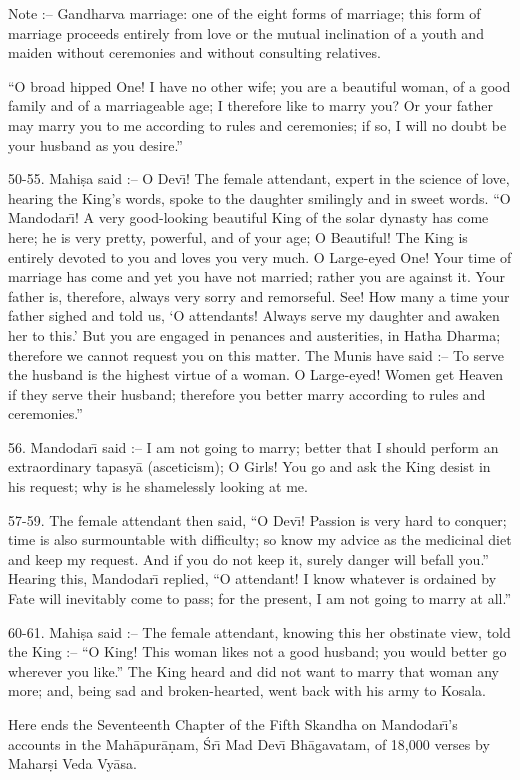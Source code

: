 Note :-- Gandharva marriage: one of the eight forms of marriage; this form of marriage proceeds entirely from love or the mutual inclination of a youth and maiden without ceremonies and without consulting relatives.

``O broad hipped One! I have no other wife; you are a beautiful woman, of a good family and of a marriageable age; I therefore like to marry you? Or your father may marry you to me according to rules and ceremonies; if so, I will no doubt be your husband as you desire.''

50-55. Mahi\d{s}a said :-- O Dev\={\i}! The female attendant, expert in the science of love, hearing the King's words, spoke to the daughter smilingly and in sweet words. ``O Mandodar\={\i}! A very good-looking beautiful King of the solar dynasty has come here; he is very pretty, powerful, and of your age; O Beautiful! The King is entirely devoted to you and loves you very much. O Large-eyed One! Your time of marriage has come and yet you have not married; rather you are against it. Your father is, therefore, always very sorry and remorseful. See! How many a time your father sighed and told us, `O attendants! Always serve my daughter and awaken her to this.' But you are engaged in penances and austerities, in Hatha Dharma; therefore we cannot request you on this matter. The Munis have said :-- To serve the husband is the highest virtue of a woman. O Large-eyed! Women get Heaven if they serve their husband; therefore you better marry according to rules and ceremonies.''

56. Mandodar\={\i} said :-- I am not going to marry; better that I should perform an extraordinary tapasy\=a (asceticism); O Girls! You go and ask the King desist in his request; why is he shamelessly looking at me.

57-59. The female attendant then said, ``O Dev\={\i}! Passion is very hard to conquer; time is also surmountable with difficulty; so know my advice as the medicinal diet and keep my request. And if you do not keep it, surely danger will befall you.'' Hearing this, Mandodar\={\i} replied, ``O attendant! I know whatever is ordained by Fate will inevitably come to pass; for the present, I am not going to marry at all.''

60-61. Mahi\d{s}a said :-- The female attendant, knowing this her obstinate view, told the King :-- ``O King! This woman likes not a good husband; you would better go wherever you like.'' The King heard and did not want to marry that woman any more; and, being sad and broken-hearted, went back with his army to Kosala.

Here ends the Seventeenth Chapter of the Fifth Skandha on Mandodar\={\i}'s accounts in the Mah\=apur\=a\d{n}am, \'Sr\={\i} Mad Dev\={\i} Bh\=agavatam, of 18,000 verses by Mahar\d{s}i Veda Vy\=asa.



